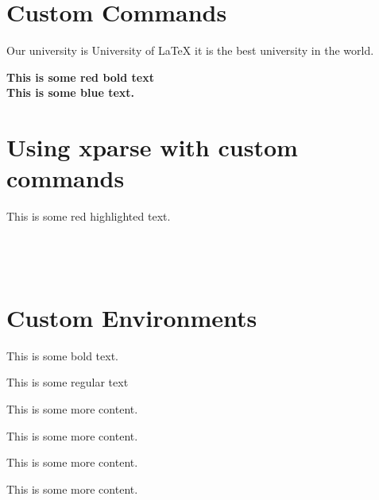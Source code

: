 \documentclass{article}
\newcommand{\universityname}{University of LaTeX\xspace}
\newcommand{\bfred}[1]{\textbf{\color{red} #1}}
\newcommand{\bfcolor}[2]{\textbf{\color{#1} #2}}
\begin{document}
	
\section{Custom Commands}

Our university is \universityname it is the best university in the world.

\bfred{This is some red bold text} \\

\bfcolor{blue}{This is some blue text.}

\section{Using xparse with custom commands}

\colorbox{red!20}{This is some red highlighted text.} \\

 \\

 \\

 \\

\section{Custom Environments}

\begin{boldtext}
This is some bold text.
\end{boldtext}

This is some regular text \\

\begin{highlightbox}
This is some more content.
\end{highlightbox}

\begin{highlightbox}[red]
This is some more content.
\end{highlightbox}

\begin{highlightbox}[purple]
This is some more content.
\end{highlightbox}

\begin{highlightbox}[blue]
This is some more content.
\end{highlightbox}
\end{document}
